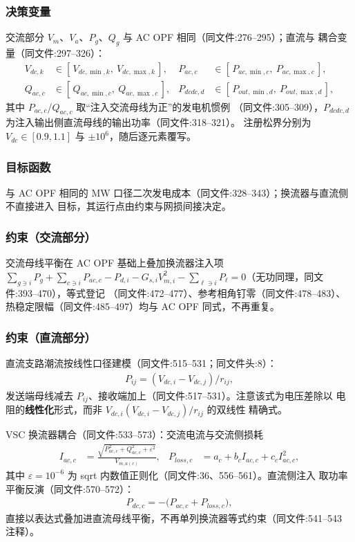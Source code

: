 \subsubsection*{决策变量}
交流部分 $V_m$、$V_a$、$P_g$、$Q_g$ 与 AC OPF 相同（同文件:276--295）；直流与
耦合变量（同文件:297--326）：
\begin{align*}
V_{dc,k} &\in [\,V_{dc,\min,k},\ V_{dc,\max,k}\,], &
P_{ac,c} &\in [\,P_{ac,\min,c},\ P_{ac,\max,c}\,],\\
Q_{ac,c} &\in [\,Q_{ac,\min,c},\ Q_{ac,\max,c}\,], &
P_{dcdc,d} &\in [\,P_{out,\min,d},\ P_{out,\max,d}\,],
\end{align*}
其中 $P_{ac,c}$/$Q_{ac,c}$ 取“注入交流母线为正”的发电机惯例
（同文件:305--309），$P_{dcdc,d}$ 为注入输出侧直流母线的输出功率（同文件:318--321）。
注册松界分别为 $V_{dc}\in[0.9,1.1]$ 与 $\pm 10^{6}$，随后逐元素覆写。

\subsubsection*{目标函数}
与 AC OPF 相同的 MW 口径二次发电成本（同文件:328--343）；换流器与直流侧不直接进入
目标，其运行点由约束与网损间接决定。

\subsubsection*{约束（交流部分）}
交流母线平衡在 AC OPF 基础上叠加换流器注入项
$\sum_{g\ni i}P_g + \sum_{c\ni i}P_{ac,c} - P_{d,i} - G_{s,i}V_{m,i}^{2}
- \sum_{\ell\ni i}P_\ell = 0$（无功同理，同文件:393--470），等式登记
（同文件:472--477）、参考相角钉零（同文件:478--483）、热稳定限幅（同文件:485--497）均与
AC OPF 同式，不再重复。

\subsubsection*{约束（直流部分）}
直流支路潮流按线性口径建模（同文件:515--531；同文件头:8）：
\begin{align*}
P_{ij} = (V_{dc,i} - V_{dc,j}) / r_{ij},
\end{align*}
发送端母线减去 $P_{ij}$、接收端加上（同文件:517--531）。注意该式为电压差除以
电阻的\textbf{线性化}形式，而非 $V_{dc,i}(V_{dc,i}-V_{dc,j})/r_{ij}$ 的双线性
精确式。

VSC 换流器耦合（同文件:533--573）：交流电流与交流侧损耗
\begin{align*}
I_{ac,c} &= \frac{\sqrt{P_{ac,c}^{2} + Q_{ac,c}^{2} + \varepsilon^{2}}}{V_{m,a(c)}},
 & P_{loss,c} &= a_c + b_c I_{ac,c} + c_c I_{ac,c}^{2},
\end{align*}
其中 $\varepsilon=10^{-6}$ 为 sqrt 内数值正则化（同文件:36、556--561）。直流侧注入
取功率平衡反演（同文件:570--572）：
\begin{align*}
P_{dc,c} = -\big(P_{ac,c} + P_{loss,c}\big),
\end{align*}
直接以表达式叠加进直流母线平衡，不再单列换流器等式约束（同文件:541--543 注释）。


